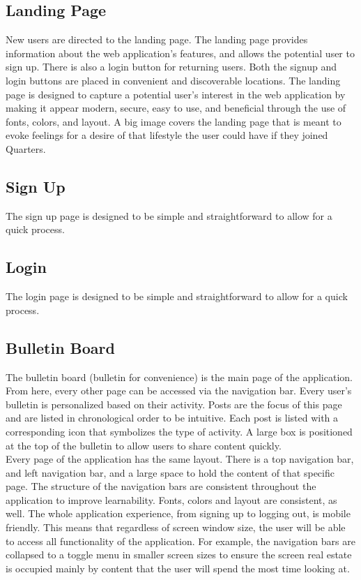 \documentclass[12pt]{article}
\begin{document}
\subsection{Landing Page}
New users are directed to the landing page. The landing page provides information about the web application's features, and allows the potential user to sign up. There is also a login button for returning users. Both the signup and login buttons are placed in convenient and discoverable locations. The landing page is designed to capture a potential user's interest in the web application by making it appear modern, secure, easy to use, and beneficial through the use of fonts, colors, and layout. A big image covers the landing page that is meant to evoke feelings for a desire of that lifestyle the user could have if they joined Quarters.

\subsection{Sign Up}
The sign up page is designed to be simple and straightforward to allow for a quick process.

\subsection{Login}
The login page is designed to be simple and straightforward to allow for a quick process.

\subsection{Bulletin Board}
The bulletin board (bulletin for convenience) is the main page of the application. From here, every other page can be accessed via the navigation bar. Every user's bulletin is personalized based on their activity. Posts are the focus of this page and are listed in chronological order to be intuitive. Each post is listed with a corresponding icon that symbolizes the type of activity. A large box is positioned at the top of the bulletin to allow users to share content quickly. \\

\noindent Every page of the application has the same layout. There is a top navigation bar, and left navigation bar, and a large space to hold the content of that specific page. The structure of the navigation bars are consistent throughout the application to improve learnability. Fonts, colors and layout are consistent, as well. The whole application experience, from signing up to logging out, is mobile friendly. This means that regardless of screen window size, the user will be able to access all functionality of the application. For example, the navigation bars are collapsed to a toggle menu in smaller screen sizes to ensure the screen real estate is occupied mainly by content that the user will spend the most time looking at.
\end{document}
